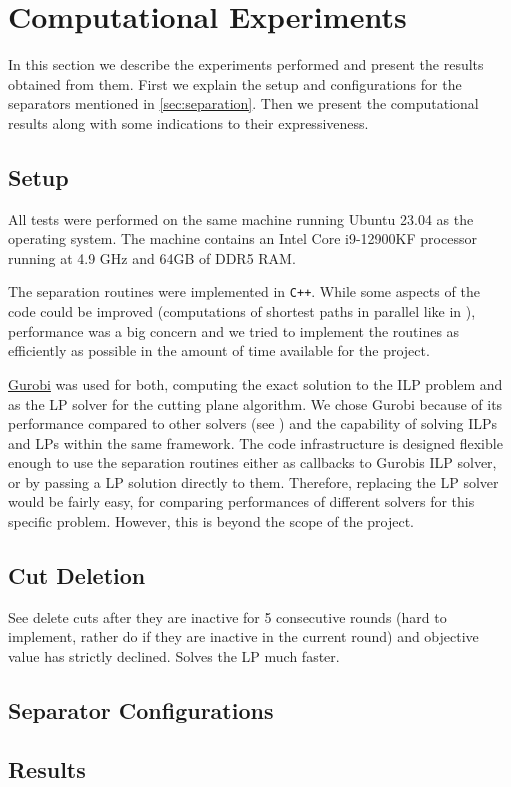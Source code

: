 \section{Computational Experiments}\label{sec:experiments}
In this section we describe the experiments performed and present the results obtained from them.
First we explain the setup and configurations for the separators mentioned in \cref{sec:separation}.
Then we present the computational results along with some indications to their expressiveness.

\subsection{Setup}\label{subsec:experiments_setup}
All tests were performed on the same machine running Ubuntu 23.04 as the operating system.
The machine contains an Intel Core i9-12900KF processor running at 4.9 GHz and 64GB of DDR5 RAM. 

The separation routines were implemented in \texttt{C++}.
While some aspects of the code could be improved (\eg computations of shortest paths in parallel like in \cite{sorensenSeparationHeuristic2Partition2020}),
performance was a big concern and we tried to implement the routines as efficiently as possible in the amount of time available for the project.

\href{https://www.gurobi.com}{Gurobi} was used for both, computing the exact solution to the ILP problem and as the LP solver for the cutting plane algorithm.
We chose Gurobi because of its performance compared to other solvers (see \cite{meindlAnalysisCommercialFree2012}) and the capability of solving ILPs and LPs within the same framework.
The code infrastructure is designed flexible enough to use the separation routines either as callbacks to Gurobis ILP solver, or by passing a LP solution directly to them.
Therefore, replacing the LP solver would be fairly easy, \eg for comparing performances of different solvers for this specific problem.
However, this is beyond the scope of the project.

\subsection{Cut Deletion}\label{subsec:cut_deletion}
See \cite{sorensenSeparationHeuristic2Partition2020} \rightarrow delete cuts after they are inactive for 5 consecutive rounds (hard to implement, rather do if they are inactive in the current round) and objective value has strictly declined.
Solves the LP much faster.

\subsection{Separator Configurations}\label{subsec:run_configs}

\subsection{Results}\label{subsec:experiments_results}
